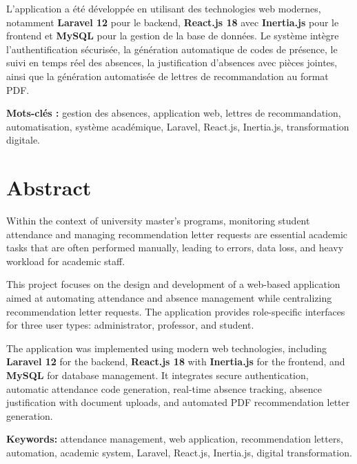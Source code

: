 \documentclass[12pt, a4paper, openright]{report}
\begin{document}
L'application a été développée en utilisant des technologies web modernes, notamment \textbf{Laravel 12} pour le backend, \textbf{React.js 18} avec \textbf{Inertia.js} pour le frontend et \textbf{MySQL} pour la gestion de la base de données. Le système intègre l'authentification sécurisée, la génération automatique de codes de présence, le suivi en temps réel des absences, la justification d'absences avec pièces jointes, ainsi que la génération automatisée de lettres de recommandation au format PDF.

\vspace{1.5cm}
\textbf{Mots-clés :} gestion des absences, application web, lettres de recommandation, automatisation, système académique, Laravel, React.js, Inertia.js, transformation digitale.

\vspace{2cm}
\section*{Abstract}
Within the context of university master's programs, monitoring student attendance and managing recommendation letter requests are essential academic tasks that are often performed manually, leading to errors, data loss, and heavy workload for academic staff.

This project focuses on the design and development of a web-based application aimed at automating attendance and absence management while centralizing recommendation letter requests. The application provides role-specific interfaces for three user types: administrator, professor, and student.

The application was implemented using modern web technologies, including \textbf{Laravel 12} for the backend, \textbf{React.js 18} with \textbf{Inertia.js} for the frontend, and \textbf{MySQL} for database management. It integrates secure authentication, automatic attendance code generation, real-time absence tracking, absence justification with document uploads, and automated PDF recommendation letter generation.

\vspace{1.5cm}
\textbf{Keywords:} attendance management, web application, recommendation letters, automation, academic system, Laravel, React.js, Inertia.js, digital transformation.

\cleardoublepage
\tableofcontents

\cleardoublepage
\listoffigures
\end{document}
